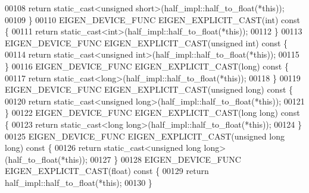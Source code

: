 \begin{DoxyCode}
00108     \textcolor{keywordflow}{return} \textcolor{keyword}{static\_cast<}\textcolor{keywordtype}{unsigned} \textcolor{keywordtype}{short}\textcolor{keyword}{>}(half\_impl::half\_to\_float(*\textcolor{keyword}{this}));
00109   \}
00110   EIGEN\_DEVICE\_FUNC EIGEN\_EXPLICIT\_CAST(\textcolor{keywordtype}{int})\textcolor{keyword}{ const }\{
00111     \textcolor{keywordflow}{return} \textcolor{keyword}{static\_cast<}\textcolor{keywordtype}{int}\textcolor{keyword}{>}(half\_impl::half\_to\_float(*\textcolor{keyword}{this}));
00112   \}
00113   EIGEN\_DEVICE\_FUNC EIGEN\_EXPLICIT\_CAST(\textcolor{keywordtype}{unsigned} \textcolor{keywordtype}{int})\textcolor{keyword}{ const }\{
00114     \textcolor{keywordflow}{return} \textcolor{keyword}{static\_cast<}\textcolor{keywordtype}{unsigned} \textcolor{keywordtype}{int}\textcolor{keyword}{>}(half\_impl::half\_to\_float(*\textcolor{keyword}{this}));
00115   \}
00116   EIGEN\_DEVICE\_FUNC EIGEN\_EXPLICIT\_CAST(\textcolor{keywordtype}{long})\textcolor{keyword}{ const }\{
00117     \textcolor{keywordflow}{return} \textcolor{keyword}{static\_cast<}\textcolor{keywordtype}{long}\textcolor{keyword}{>}(half\_impl::half\_to\_float(*\textcolor{keyword}{this}));
00118   \}
00119   EIGEN\_DEVICE\_FUNC EIGEN\_EXPLICIT\_CAST(\textcolor{keywordtype}{unsigned} \textcolor{keywordtype}{long})\textcolor{keyword}{ const }\{
00120     \textcolor{keywordflow}{return} \textcolor{keyword}{static\_cast<}\textcolor{keywordtype}{unsigned} \textcolor{keywordtype}{long}\textcolor{keyword}{>}(half\_impl::half\_to\_float(*\textcolor{keyword}{this}));
00121   \}
00122   EIGEN\_DEVICE\_FUNC EIGEN\_EXPLICIT\_CAST(\textcolor{keywordtype}{long} \textcolor{keywordtype}{long})\textcolor{keyword}{ const }\{
00123     \textcolor{keywordflow}{return} \textcolor{keyword}{static\_cast<}\textcolor{keywordtype}{long} \textcolor{keywordtype}{long}\textcolor{keyword}{>}(half\_impl::half\_to\_float(*\textcolor{keyword}{this}));
00124   \}
00125   EIGEN\_DEVICE\_FUNC EIGEN\_EXPLICIT\_CAST(\textcolor{keywordtype}{unsigned} \textcolor{keywordtype}{long} \textcolor{keywordtype}{long})\textcolor{keyword}{ const }\{
00126     \textcolor{keywordflow}{return} \textcolor{keyword}{static\_cast<}\textcolor{keywordtype}{unsigned} \textcolor{keywordtype}{long} \textcolor{keywordtype}{long}\textcolor{keyword}{>}(half\_to\_float(*\textcolor{keyword}{this}));
00127   \}
00128   EIGEN\_DEVICE\_FUNC EIGEN\_EXPLICIT\_CAST(\textcolor{keywordtype}{float})\textcolor{keyword}{ const }\{
00129     \textcolor{keywordflow}{return} half\_impl::half\_to\_float(*\textcolor{keyword}{this});
00130   \}

\end{DoxyCode}
